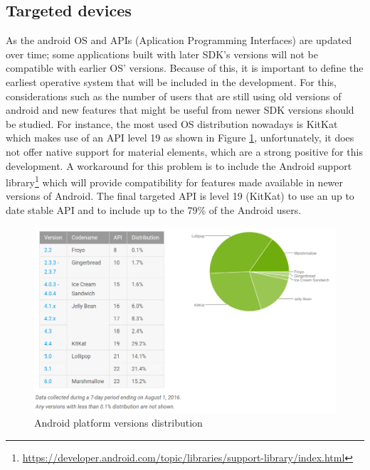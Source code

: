 \subsection{Targeted devices}
As the android OS and APIs (Aplication Programming Interfaces) are updated over time; some applications built with later SDK's versions will not be compatible with earlier OS' versions. Because of this, it is important to define the earliest operative system that will be included in the development. For this, considerations such as the number of users that are still using old versions of android and new features that might be useful from newer SDK versions should be studied. For instance, the most used OS distribution nowadays is KitKat which makes use of an API level 19 as shown in Figure \ref{fig:android_platform_versions}, unfortunately, it does not offer native support for material elements, which are a strong positive for this development. A workaround for this problem is to include the Android support library\footnote{\url{https://developer.android.com/topic/libraries/support-library/index.html}} which will provide compatibility for features made available in newer versions of Android. The final targeted API is level 19 (KitKat) to use an up to date stable API and to include up to the 79\% of the Android users.  

\begin{figure}[H]
\begin{adjustbox}{width=1\textwidth,center=\textwidth}
  \centering
  \includegraphics[scale=1]{images/android_platform_versions.png}
\end{adjustbox}
  \caption[Android platform versions distribution]{Android platform versions distribution \footnotemark}
  \label{fig:android_platform_versions}
\end{figure}


